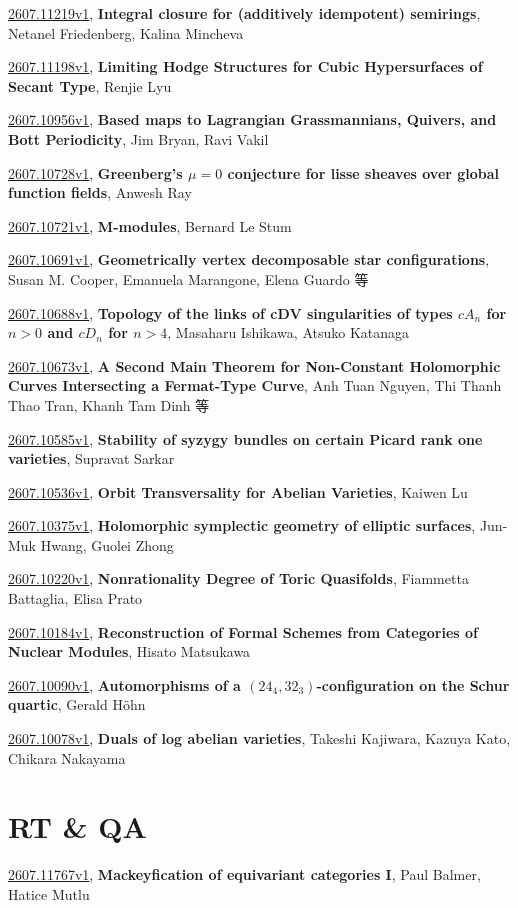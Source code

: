 \documentclass[9pt, a4paper]{article}
\theoremstyle{plain}
\theoremstyle{definition}
\theoremstyle{remark}
\newcommand{\arxiv}[3]{\href{https://arxiv.org/abs/#1}{#1}, \textbf{\textcolor{arxivblue}{#2}}, #3}
\begin{document}
\arxiv{2607.11219v1}{Integral closure for (additively idempotent) semirings}{Netanel Friedenberg, Kalina Mincheva}

\arxiv{2607.11198v1}{Limiting Hodge Structures for Cubic Hypersurfaces of Secant Type}{Renjie Lyu}

\arxiv{2607.10956v1}{Based maps to Lagrangian Grassmannians, Quivers, and Bott Periodicity}{Jim Bryan, Ravi Vakil}

\arxiv{2607.10728v1}{Greenberg's $μ=0$ conjecture for lisse sheaves over global function fields}{Anwesh Ray}

\arxiv{2607.10721v1}{M-modules}{Bernard Le Stum}

\arxiv{2607.10691v1}{Geometrically vertex decomposable star configurations}{Susan M. Cooper, Emanuela Marangone, Elena Guardo 等}

\arxiv{2607.10688v1}{Topology of the links of cDV singularities of types $cA_n$ for $n>0$ and $cD_n$ for $n>4$}{Masaharu Ishikawa, Atsuko Katanaga}

\arxiv{2607.10673v1}{A Second Main Theorem for Non-Constant Holomorphic Curves Intersecting a Fermat-Type Curve}{Anh Tuan Nguyen, Thi Thanh Thao Tran, Khanh Tam Dinh 等}

\arxiv{2607.10585v1}{Stability of syzygy bundles on certain Picard rank one varieties}{Supravat Sarkar}

\arxiv{2607.10536v1}{Orbit Transversality for Abelian Varieties}{Kaiwen Lu}

\arxiv{2607.10375v1}{Holomorphic symplectic geometry of elliptic surfaces}{Jun-Muk Hwang, Guolei Zhong}

\arxiv{2607.10220v1}{Nonrationality Degree of Toric Quasifolds}{Fiammetta Battaglia, Elisa Prato}

\arxiv{2607.10184v1}{Reconstruction of Formal Schemes from Categories of Nuclear Modules}{Hisato Matsukawa}

\arxiv{2607.10090v1}{Automorphisms of a $(24_4, 32_3)$-configuration on the Schur quartic}{Gerald Höhn}

\arxiv{2607.10078v1}{Duals of log abelian varieties}{Takeshi Kajiwara, Kazuya Kato, Chikara Nakayama}


\section{RT \& QA}
\arxiv{2607.11767v1}{Mackeyfication of equivariant categories I}{Paul Balmer, Hatice Mutlu}
\end{document}
